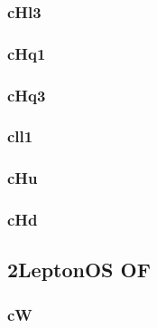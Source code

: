 \documentclass[landscape, 12pt,letterpaper]{article}
\begin{document}
\newpage

\subsubsection{cHl3}


\newpage

\subsubsection{cHq1}


\newpage

\subsubsection{cHq3}


\newpage

\subsubsection{cll1}


\newpage

\subsubsection{cHu}


\newpage

\subsubsection{cHd}


\newpage

\newpage

\subsection{2LeptonOS OF}
\subsubsection{cW}


\newpage

\newpage
\end{document}
